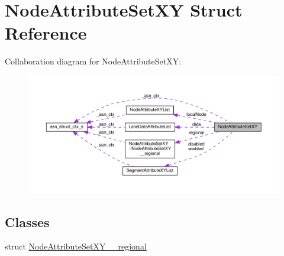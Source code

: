\hypertarget{structNodeAttributeSetXY}{}\section{Node\+Attribute\+Set\+XY Struct Reference}
\label{structNodeAttributeSetXY}


Collaboration diagram for Node\+Attribute\+Set\+XY\+:\nopagebreak
\begin{figure}[H]
\begin{center}
\leavevmode
\includegraphics[width=350pt]{structNodeAttributeSetXY__coll__graph}
\end{center}
\end{figure}
\subsection*{Classes}
\begin{DoxyCompactItemize}
\item 
struct \hyperlink{structNodeAttributeSetXY_1_1NodeAttributeSetXY____regional}{Node\+Attribute\+Set\+X\+Y\+\_\+\+\_\+regional}
\end{DoxyCompactItemize}
